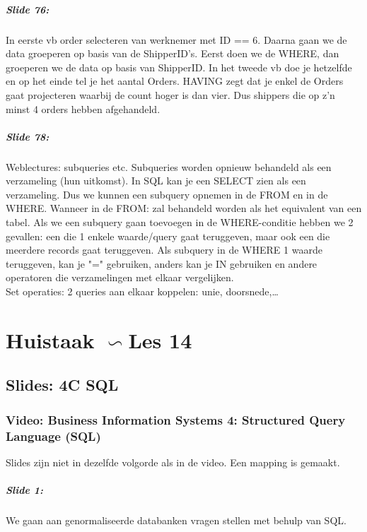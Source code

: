 \documentclass[10pt,a4paper]{report}
\begin{document}
\paragraph{Slide 76:}In eerste vb order selecteren van werknemer met ID == 6. Daarna gaan we de data groeperen op basis van de ShipperID's. Eerst doen we de WHERE, dan groeperen we de data op basis van ShipperID. In het tweede vb doe je hetzelfde en op het einde tel je het aantal Orders. HAVING zegt dat je enkel de Orders gaat projecteren waarbij de count hoger is dan vier. Dus shippers die op z'n minst 4 orders hebben afgehandeld.

\paragraph{Slide 78:}Weblectures: subqueries etc. 
Subqueries worden opnieuw behandeld als een verzameling (hun uitkomst). In SQL kan je een SELECT zien als een verzameling. Dus we kunnen een subquery opnemen in de FROM en in de WHERE. Wanneer in de FROM: zal behandeld worden als het equivalent van een tabel. Als we een subquery gaan toevoegen in de WHERE-conditie hebben we 2 gevallen: een die 1 enkele waarde/query gaat teruggeven, maar ook een die meerdere records gaat teruggeven. Als subquery in de WHERE 1 waarde teruggeven, kan je "=" gebruiken, anders kan je IN gebruiken en andere operatoren die verzamelingen met elkaar vergelijken.\\
Set operaties: 2 queries aan elkaar koppelen: unie, doorsnede,…

\chapter{Huistaak $\backsim$Les 14}
\section{Slides: 4C  SQL}
\subsection{Video: Business Information Systems 4: Structured Query Language (SQL)}
Slides zijn niet in dezelfde volgorde als in de video. Een mapping is gemaakt.

\paragraph{Slide 1:}We gaan aan genormaliseerde databanken vragen stellen met behulp van SQL.
\end{document}
